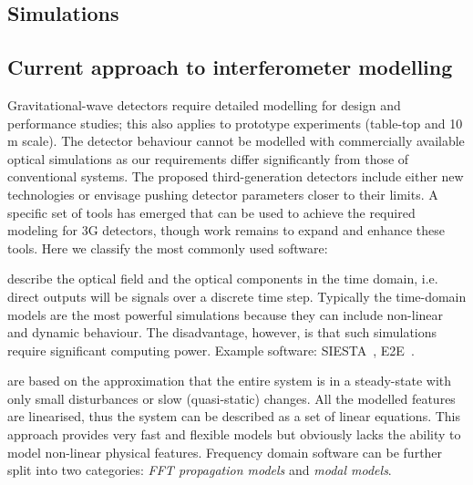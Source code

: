 \begin{samepage} %

\section{Simulations}
\subsection{Current approach to interferometer modelling}
Gravitational-wave detectors require detailed modelling for design and performance studies; this also applies 
to prototype experiments (table-top and 10\,m scale). 
The detector behaviour cannot be modelled with commercially available optical simulations as our requirements differ significantly from those of conventional systems. 
The proposed third-generation detectors include either new technologies or envisage pushing detector parameters closer to their limits. 
A specific set of tools has emerged that can be used to achieve the required modeling for 3G detectors, though work remains to expand and enhance these tools. Here we classify the most commonly used software:

 describe the optical field and the optical components in the time domain, i.e. direct outputs will be signals over a discrete time step. Typically the time-domain models are the most powerful   simulations because they can include non-linear and dynamic behaviour.
The disadvantage, however, is that such simulations require significant computing power. Example software: SIESTA~\cite{SIESTA}, E2E~\cite{e2e_2000}.


 are based on the approximation that the entire system is in a steady-state with only small disturbances or slow (quasi-static) changes. All the modelled features are linearised, thus the system can be described as a set of linear equations. 
This approach provides very fast and flexible models but obviously lacks the ability to model non-linear physical features. Frequency domain software can be further split into two categories: \emph{FFT propagation models} and \emph{modal models}.

\end{samepage} %

